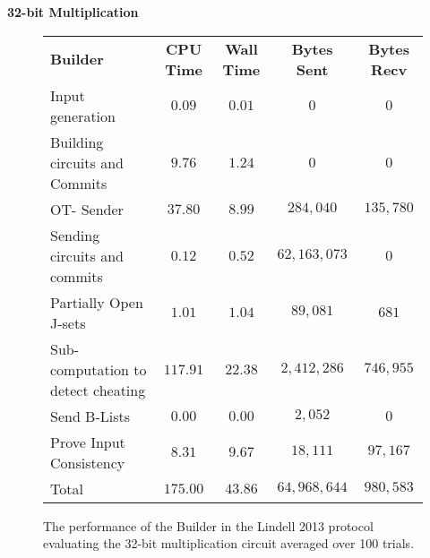 \documentclass[ %
                    author={Nicholas Tutte},
                supervisor={Prof. Nigel Smart},
                    degree={MEng},
                     title={Secure Two Party Computation},
                  subtitle={A practical comparison of recent protocols},
                      type={Research - GG1K},
                      year={2015} ]{dissertation}
\begin{document}
				\FloatBarrier
				\noindent \textbf{32-bit Multiplication}
				\begin{figure}[!ht]
					\begin{tabular}{| p{4.3cm} | c c c c |}
						\hline
						\textbf{Builder} & \textbf{CPU Time} & \textbf{Wall Time} & \textbf{Bytes Sent} & \textbf{Bytes Recv} \\
						\thickhline
						Input generation & $0.09$ & $0.01$ & $0$ & $0$ \\
						\hline
						Building circuits and Commits & $9.76$ & $1.24$ & $0$ & $0$ \\
						\hline
						OT- Sender & $37.80$ & $8.99$ & $284,040$ & $135,780$ \\
						\hline
						Sending circuits and commits & $0.12$ & $0.52$ & $62,163,073$ & $0$ \\
						\hline
						Partially Open J-sets & $1.01$ & $1.04$ & $89,081$ & $681$ \\
						\hline
						Sub-computation to detect cheating & $117.91$ & $22.38$ & $2,412,286$ & $746,955$ \\
						\hline
						Send B-Lists & $0.00$ & $0.00$ & $2,052$ & $0$ \\
						\hline
						Prove Input Consistency & $8.31$ & $9.67$ & $18,111$ & $97,167$ \\
						\thickhline
						Total & $175.00$ & $43.86$ & $64,968,644$ & $980,583$ \\
						\hline
					\end{tabular}
					\caption{The performance of the Builder in the Lindell 2013 protocol evaluating the 32-bit multiplication circuit averaged over 100 trials. \label{table:L_2013_Mul_Builder} }
				\end{figure}
				
\end{document}
